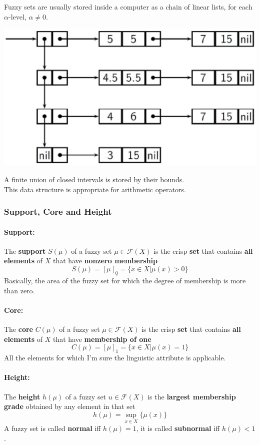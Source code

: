 \documentclass[11pt]{article}
\begin{document}
		Fuzzy sets are usually stored inside a computer as a chain of linear lists, for each $\alpha$-level, $\alpha \neq 0$.
		\begin{center}
			\includegraphics[width=0.7\columnwidth]{img/FS/hr4}
		\end{center}
		A finite union of closed intervals is stored by their bounds.\\
		
		This data structure is appropriate for arithmetic operators.\\
		
		\newpage
		
		\subsubsection{Support, Core and Height}
		
		\paragraph{Support:} The \textbf{support} $S(\mu)$ of a fuzzy set $\mu \in \mathcal{F}(X)$ is the crisp \textbf{set} that contains \textbf{all elements} of $X$ that have \textbf{nonzero membership} 
		$$ S(\mu) = [\mu]_{\underline{0}} = \{x \in X | \mu (x) > 0 \} $$
		Basically, the area of the fuzzy set for which the degree of membership is more than zero.\\ \nn
		
		\paragraph{Core:} The \textbf{core} $C(\mu)$ of a fuzzy set $\mu \in \mathcal{F} (X)$ is the crisp \textbf{set} that contains \textbf{all elements} of $X$ that have \textbf{membership of one}
		$$ C(\mu) = [\mu]_1 = \{x \in X | \mu(x) = 1 \} $$
		All the elements for which I'm sure the linguistic attribute is applicable.\\ \nn
		
		\paragraph{Height:} The \textbf{height} $h(\mu)$ of a fuzzy set $u \in \mathcal{F} (X)$ is the \textbf{largest membership grade} obtained by any element in that set 
		$$ h(\mu) = \sup_{x \in X} \{\mu (x)\} $$
		A fuzzy set is called \textbf{normal} iff $h (\mu) = 1$, it is called \textbf{subnormal} iff $h(\mu) < 1$.\\
		
\end{document}

